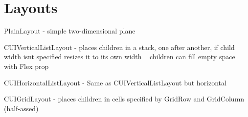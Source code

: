 \chapter{Layouts }
\hypertarget{_overview_layouts}{}\label{_overview_layouts}
\label{_overview_layouts_md__docs_sources_2_sources_2_overview_2_layouts}%
%



\begin{DoxyItemize}
\item Plain\+Layout -\/ simple two-\/dimensional plane
\item CUIVertical\+List\+Layout -\/ places children in a stack, one after another, if child width isn\textquotesingle{}t specified resizes it to its own width ~\newline
 children can fill empty space with Flex prop
\item CUIHorizontal\+List\+Layout -\/ Same as CUIVertical\+List\+Layout but horizontal
\item CUIGrid\+Layout -\/ places children in cells specified by Grid\+Row and Grid\+Column (half-\/assed) 
\end{DoxyItemize}